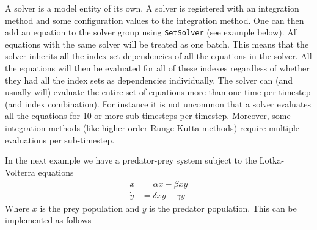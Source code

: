 \documentclass[11pt]{article}
\theoremstyle{definition}
\begin{document}
A solver is a model entity of its own. A solver is registered with an integration method and some configuration values to the integration method. One can then add an equation to the solver group using {\tt SetSolver} (see example below). All equations with the same solver will be treated as one batch. This means that the solver inherits all the index set dependencies of all the equations in the solver. All the equations will then be evaluated for all of these indexes regardless of whether they had all the index sets as dependencies individually. The solver can (and usually will) evaluate the entire set of equations more than one time per timestep (and index combination). For instance it is not uncommon that a solver evaluates all the equations for 10 or more sub-timesteps per timestep. Moreover, some integration methods (like higher-order Runge-Kutta methods) require multiple evaluations per sub-timestep.

In the next example we have a predator-prey system subject to the Lotka-Volterra equations
\begin{align*}
\dot{x} &= \alpha x - \beta xy\\
\dot{y} &= \delta xy - \gamma y
\end{align*}
Where $x$ is the prey population and $y$ is the predator population. This can be implemented as follows
\end{document}
